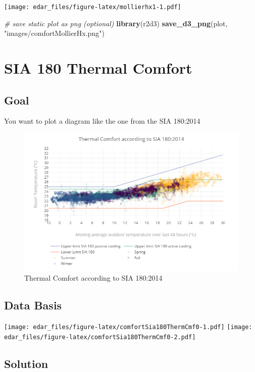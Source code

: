 \documentclass[
]{book}
\newenvironment{Shaded}{\begin{snugshade}}{\end{snugshade}}
\newcommand{\CommentTok}[1]{\textcolor[rgb]{0.56,0.35,0.01}{\textit{#1}}}
\newcommand{\KeywordTok}[1]{\textcolor[rgb]{0.13,0.29,0.53}{\textbf{#1}}}
\newcommand{\NormalTok}[1]{#1}
\newcommand{\StringTok}[1]{\textcolor[rgb]{0.31,0.60,0.02}{#1}}
\let\oldShaded\Shaded
\let\endoldShaded\endShaded
\renewenvironment{Shaded}{\footnotesize\oldShaded}{\endoldShaded}
\begin{document}
\texttt{[image: edar\_files/figure-latex/mollierhx1-1.pdf]}

\begin{Shaded}
\begin{Highlighting}[]
\CommentTok{# save static plot as png (optional)}
\KeywordTok{library}\NormalTok{(r2d3)}
\KeywordTok{save_d3_png}\NormalTok{(plot, }\StringTok{"images/comfortMollierHx.png"}\NormalTok{)}
\end{Highlighting}
\end{Shaded}

\hypertarget{sia-180-thermal-comfort}{%
\section{SIA 180 Thermal Comfort}\label{sia-180-thermal-comfort}}

\hypertarget{goal-13}{%
\subsection{Goal}\label{goal-13}}

You want to plot a diagram like the one from the SIA 180:2014

\begin{figure}
\includegraphics[width=0.7\linewidth]{images/comfortSia180ThermCmf} \caption{Thermal Comfort according to SIA 180:2014}\label{fig:unnamed-chunk-23}
\end{figure}

\hypertarget{data-basis-13}{%
\subsection{Data Basis}\label{data-basis-13}}

\texttt{[image: edar\_files/figure-latex/comfortSia180ThermCmf0-1.pdf]} \texttt{[image: edar\_files/figure-latex/comfortSia180ThermCmf0-2.pdf]}

\hypertarget{solution-13}{%
\subsection{Solution}\label{solution-13}}
\end{document}
